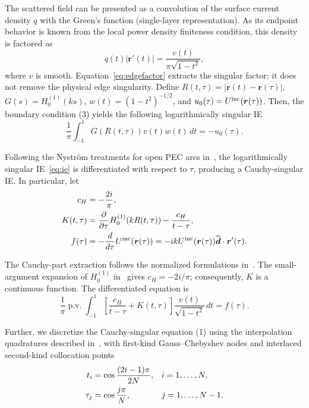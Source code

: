 \documentclass[conference]{IEEEtran}
\begin{document}
The scattered field can be presented as a convolution of the surface current
density $q$ with the Green's function (single-layer representation).  As its 
endpoint behavior is known from the local 
power density finiteness condition, this density is factored as
\begin{equation}
 q(t)|\boldsymbol r'(t)|
 =\frac{v(t)}{\pi\sqrt{1-t^2}},
 \label{eq:edgefactor}
\end{equation}
where $v$ is smooth.  Equation~\eqref{eq:edgefactor} extracts the singular
factor; it does not remove the physical edge singularity.  Define
$R(t,\tau)=|\boldsymbol r(t)-\boldsymbol r(\tau)|$,
$G(s)=H_0^{(1)}(ks)$, $w(t)=(1-t^2)^{-1/2}$, and
$u_0(\tau)=U^{\rm inc}(\boldsymbol r(\tau))$.  Then, the boundary condition (3)
yields the following logarithmically singular IE
\begin{equation}
 \frac{1}{\pi}\int_{-1}^{1}G(R(t,\tau))v(t)w(t)\,dt=-u_0(\tau).
 \label{eq:ie}
\end{equation}

Following the Nystr\"om treatments for open PEC arcs
in~\cite{nosich2005,nosich2007,gandel2010}, the logarithmically singular
IE~\eqref{eq:ie} is differentiated with respect to $\tau$, producing a
Cauchy-singular IE.  In particular, let
\begin{align}
 c_H&=-\frac{2i}{\pi},                                                   \label{eq:ch}\\
 K(t,\tau)&=\frac{\partial}{\partial\tau}
 H_0^{(1)}\!\left(kR(t,\tau)\right)-\frac{c_H}{t-\tau},                 \label{eq:kernel}\\
 f(\tau)&=-\frac{d}{d\tau}U^{\rm inc}(\boldsymbol r(\tau))
 =-ikU^{\rm inc}(\boldsymbol r(\tau))
 \widehat{\boldsymbol d}\mathbin{\cdot}\boldsymbol r'(\tau).
 \label{eq:rhs}
\end{align}

The Cauchy-part extraction follows the normalized formulations
in~\cite{nosich2005,nosich2007}.  The
small-argument expansion of $H_0^{(1)}$ in~\cite{shapoval2011} gives
$c_H=-2i/\pi$; consequently, $K$ is a continuous function.  The
differentiated equation is
\begin{equation}
 \frac{1}{\pi}\operatorname{p.v.}\!\int_{-1}^{1}
 \left[\frac{c_H}{t-\tau}+K(t,\tau)\right]
 \frac{v(t)}{\sqrt{1-t^2}}\,dt=f(\tau).
 \label{eq:cauchyie}
\end{equation}

Further, we discretize the Cauchy-singular equation (1) using the interpolation 
quadratures described in~\cite{nosich2005,nosich2007,nosich_josa2007}, with first-kind
Gauss--Chebyshev nodes and interlaced second-kind collocation points
\begin{align}
 t_i&=\cos\frac{(2i-1)\pi}{2N},&&i=1,\ldots,N, \notag\\
 \tau_j&=\cos\frac{j\pi}{N},&&j=1,\ldots,N-1.                    \label{eq:nodes}
\end{align}
\end{document}

